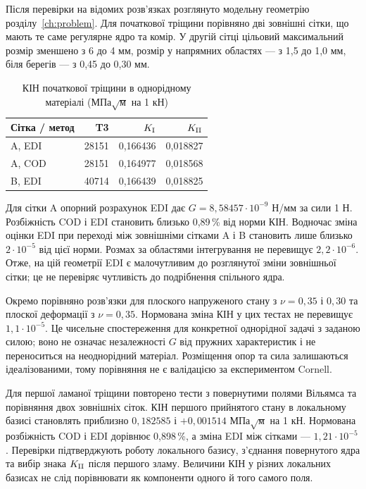 Після перевірки на відомих розв'язках розглянуто модельну геометрію розділу~\ref{ch:problem}. Для початкової тріщини порівняно дві зовнішні сітки, що мають те саме регулярне ядро та комір. У другій сітці цільовий максимальний розмір зменшено з 6 до 4 мм, розмір у напрямних областях --- з 1,5 до 1,0 мм, біля берегів --- з 0,45 до 0,30 мм.

\begin{table}[htbp]
 \centering
 \caption{КІН початкової тріщини в однорідному матеріалі (МПа$\sqrt{\text{м}}$ на 1 кН)}
 \label{tab:ver-s0}
 \begin{tabular}{lrrr}
 \toprule
 Сітка / метод & T3 & $K_{\mathrm{I}}$ & $K_{\mathrm{II}}$\\
 \midrule
 A, EDI & 28151 & 0,166436 & 0,018827\\
 A, COD & 28151 & 0,164977 & 0,018568\\
 B, EDI & 40714 & 0,166439 & 0,018825\\
 \bottomrule
 \end{tabular}
\end{table}

Для сітки A опорний розрахунок EDI дає $G=8{,}58457\cdot10^{-9}$ Н/мм за сили 1 Н. Розбіжність COD і EDI становить близько 0,89\,\% від норми КІН. Водночас зміна оцінки EDI при переході між зовнішніми сітками A і B становить лише близько $2\cdot10^{-5}$ від цієї норми. Розмах за областями інтегрування не перевищує $2{,}2\cdot10^{-6}$. Отже, на цій геометрії EDI є малочутливим до розглянутої зміни зовнішньої сітки; це не перевіряє чутливість до подрібнення спільного ядра.

Окремо порівняно розв'язки для плоского напруженого стану з $\nu=0{,}35$ і $0{,}30$ та плоскої деформації з $\nu=0{,}35$. Нормована зміна КІН у цих тестах не перевищує $1{,}1\cdot10^{-5}$. Це чисельне спостереження для конкретної однорідної задачі з заданою силою; воно не означає незалежності $G$ від пружних характеристик і не переноситься на неоднорідний матеріал. Розміщення опор та сила залишаються ідеалізованими, тому порівняння не є валідацією за експериментом Cornell.

Для першої ламаної тріщини повторено тести з повернутими полями Вільямса та порівняння двох зовнішніх сіток. КІН першого прийнятого стану в локальному базисі становлять приблизно $0{,}182585$ і $+0{,}001514$ МПа$\sqrt{\text{м}}$ на 1 кН. Нормована розбіжність COD і EDI дорівнює 0,898\,\%, а зміна EDI між сітками --- $1{,}21\cdot10^{-5}$. Перевірки підтверджують роботу локального базису, з'єднання повернутого ядра та вибір знака $K_{\mathrm{II}}$ після першого зламу. Величини КІН у різних локальних базисах не слід порівнювати як компоненти одного й того самого поля.

